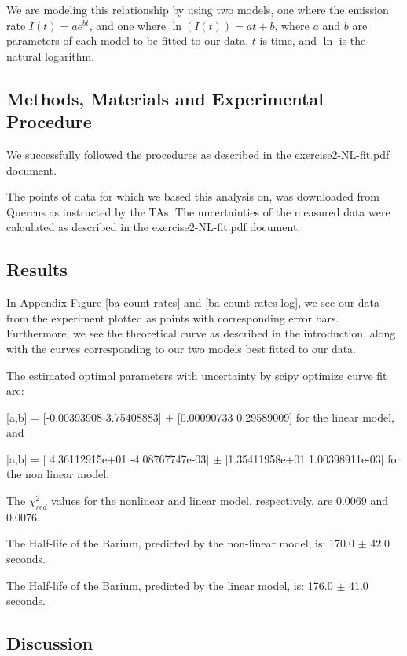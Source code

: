 \documentclass[letterpaper,12pt]{article}
\begin{document}
We are modeling this relationship by using two models, one where the emission rate 
$I(t) = ae^{bt}$, and one where $\ln(I(t)) = at+b$, 
where $a$ and $b$ are parameters of each model to be fitted to our data, 
$t$ is time, and $\ln$ is the natural logarithm.

\subsection{Methods, Materials and Experimental Procedure}

We successfully followed the procedures as described in the exercise2-NL-fit.pdf \cite{lab-manual-ex2}
document.

The points of data for which we based this analysis on, 
was downloaded from Quercus as instructed by the TAs. 
The uncertainties of the measured data were calculated as described 
in the exercise2-NL-fit.pdf \cite{lab-manual-ex2} document.

\subsection{Results}

In Appendix Figure \ref{ba-count-rates} and \ref{ba-count-rates-log}, we see our data from the experiment 
plotted as points with corresponding error bars. 
Furthermore, we see the theoretical curve as described in the introduction, 
along with the curves corresponding to our two models best fitted to our data. 

The estimated optimal parameters with uncertainty by scipy optimize curve fit are: 

[a,b] = [-0.00393908  3.75408883] $\pm$ [0.00090733 0.29589009] for the linear model, and

[a,b] = [ 4.36112915e+01 -4.08767747e-03] $\pm$ [1.35411958e+01 1.00398911e-03] for the non linear model.

The $\chi^2_{red}$ values for the nonlinear and linear model, respectively, are 0.0069 and 0.0076.

The Half-life of the Barium, predicted by the non-linear model, is: 170.0 $\pm$ 42.0 seconds.

The Half-life of the Barium, predicted by the linear model, is: 176.0 $\pm$ 41.0 seconds.

\subsection{Discussion}
\end{document}
